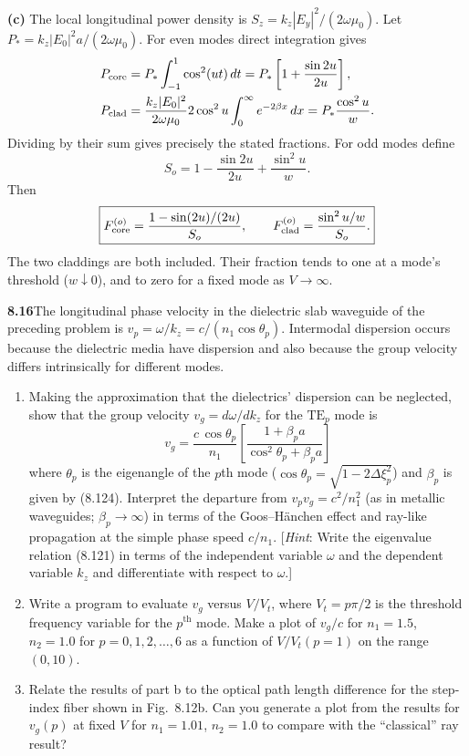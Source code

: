 \medskip\noindent\textbf{(c)} The local longitudinal power density is
$S_z=k_z|E_y|^2/(2\omega\mu_0)$.  Let
$P_*=k_z|E_0|^2a/(2\omega\mu_0)$.
For even modes direct integration gives
\begin{align*}
P_{\rm core}&=P_*\int_{-1}^1\cos^2(ut)\,dt
 =P_*\left[1+\frac{\sin2u}{2u}\right],\\
P_{\rm clad}&=\frac{k_z|E_0|^2}{2\omega\mu_0}
 2\cos^2u\int_0^\infty e^{-2\beta x}\,dx
 =P_*\frac{\cos^2u}{w}.
\end{align*}
Dividing by their sum gives precisely the stated fractions.  For
odd modes define
\[
S_o=1-\frac{\sin2u}{2u}+\frac{\sin^2u}{w}.
\]
Then
\[
\boxed{F_{\rm core}^{(o)}=\frac{1-\sin(2u)/(2u)}{S_o},\qquad
F_{\rm clad}^{(o)}=\frac{\sin^2u/w}{S_o}.}
\]
The two claddings are both included.  Their fraction tends to one
at a mode's threshold ($w\downarrow0$), and to zero for a fixed
mode as $V\to\infty$.

\par\bigskip
\noindent\textbf{8.16}\quad The longitudinal phase velocity in the dielectric slab waveguide of the preceding problem is $v_{p}=\omega/k_{z}=c/(n_{1}\cos\theta_{p})$. Intermodal dispersion occurs because the dielectric media have dispersion and also because the group velocity differs intrinsically for different modes.
\begin{enumerate}
\item[(a)] Making the approximation that the dielectrics' dispersion can be neglected, show that the group velocity $v_{g}=d\omega/dk_{z}$ for the $\mathrm{TE}_{p}$ mode is
\[
v_{g}=\frac{c\,\cos\theta_{p}}{n_{1}}\left[\frac{1+\beta_{p}a}{\cos^{2}\theta_{p}+\beta_{p}a}\right]
\]
where $\theta_{p}$ is the eigenangle of the $p$th mode ($\cos\theta_{p}=\sqrt{1-2\Delta\xi_{p}^{2}}$) and $\beta_{p}$ is given by (8.124). Interpret the departure from $v_{p}v_{g}=c^{2}/n_{1}^{2}$ (as in metallic waveguides; $\beta_{p}\to\infty$) in terms of the Goos--H\"anchen effect and ray-like propagation at the simple phase speed $c/n_{1}$. [\emph{Hint}: Write the eigenvalue relation (8.121) in terms of the independent variable $\omega$ and the dependent variable $k_{z}$ and differentiate with respect to $\omega$.]
\item[(b)] Write a program to evaluate $v_{g}$ versus $V/V_{t}$, where $V_{t}=p\pi/2$ is the threshold frequency variable for the $p^{\mathrm{th}}$ mode. Make a plot of $v_{g}/c$ for $n_{1}=1.5$, $n_{2}=1.0$ for $p=0,1,2,\ldots,6$ as a function of $V/V_{t}(p=1)$ on the range $(0,10)$.
\item[(c)] Relate the results of part b to the optical path length difference for the step-index fiber shown in Fig.~8.12b. Can you generate a plot from the results for $v_{g}(p)$ at fixed $V$ for $n_{1}=1.01$, $n_{2}=1.0$ to compare with the ``classical'' ray result?
\end{enumerate}
\solution

